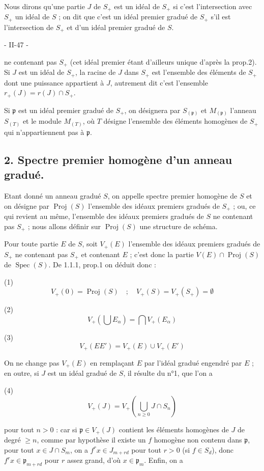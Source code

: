 Nous dirons qu'une partie $J$ de $S_+$ est un idéal de $S_+$ si c'est l'intersection avec $S_+$ un idéal de $S$ ; on dit que c'est un idéal premier gradué de $S_+$ s'il est l'intersection de $S_+$ et d'un idéal premier gradué de $S$.

\newpage


- II-47 -

ne contenant pas $S_+$ (cet idéal premier étant d'ailleurs unique d'après la prop.2). Si $J$ est un idéal de $S_+$, la racine de $J$ dans $S_+$ est l'ensemble des éléments de $S_+$ dont une puissance appartient à $J$, autrement dit c'est l'ensemble $r_+(J) = r(J) \cap S_+$.

Si $\mathfrak{p}$ est un idéal premier gradué de $S_+$, on désignera par $S_{(\mathfrak{p})}$ et $M_{(\mathfrak{p})}$ l'anneau $S_{(T)}$ et le module $M_{(T)}$, où $T$ désigne l'ensemble des éléments homogènes de $S_+$ qui n'appartiennent pas à $\mathfrak{p}$.

\subsection*{2. Spectre premier homogène d'un anneau gradué.}

Etant donné un anneau gradué $S$, on appelle spectre premier homogène de $S$ et on désigne par $\operatorname{Proj}(S)$ l'ensemble des idéaux premiers gradués de $S_+$ ; ou, ce qui revient au même, l'ensemble des idéaux premiers gradués de $S$ ne contenant pas $S_+$ ; nous allons définir sur $\operatorname{Proj}(S)$ une structure de schéma.

Pour toute partie $E$ de $S$, soit $V_+(E)$ l'ensemble des idéaux premiers gradués de $S_+$ ne contenant pas $S_+$ et contenant $E$ ; c'est donc la partie $V(E) \cap \operatorname{Proj}(S)$ de $\operatorname{Spec}(S)$. De 1.1.1, prop.1 on déduit donc :

(1) $$V_+(0) = \operatorname{Proj}(S) \quad ; \quad V_+(S) = V_+(S_+) = \emptyset$$

(2) $$V_+(\bigcup E_\alpha) = \bigcap V_+(E_\alpha)$$

(3) $$V_+(EE') = V_+(E) \cup V_+(E')$$

On ne change pas $V_+(E)$ en remplaçant $E$ par l'idéal gradué engendré par $E$ ; en outre, si $J$ est un idéal gradué de $S$, il résulte du n°1, que l'on a

(4) $$V_+(J) = V_+(\bigcup_{n \ge 0} J \cap S_n)$$

pour tout $n > 0$ : car si $\mathfrak{p} \in V_+(J)$ contient les éléments homogènes de $J$ de degré $\ge n$, comme par hypothèse il existe un $f$ homogène non contenu dans $\mathfrak{p}$, pour tout $x \in J \cap S_m$, on a $f^r x \in J_{m+rd}$ pour tout $r > 0$ (si $f \in S_d$), donc $f^r x \in \mathfrak{p}_{m+rd}$ pour $r$ assez grand, d'où $x \in \mathfrak{p}_m$. Enfin, on a

